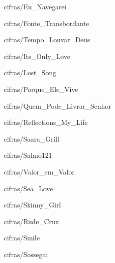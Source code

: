\documentclass{scrartcl}
\begin{document}

{cifras/Eu_Navegarei}


{cifras/Fonte_Transbordante}


{cifras/Tempo_Louvar_Deus}


{cifras/Its_Only_Love}


{cifras/Lost_Song}


{cifras/Porque_Ele_Vive}


{cifras/Quem_Pode_Livrar_Senhor}


{cifras/Reflections_My_Life}


{cifras/Saara_Grill}


{cifras/Salmo121}


{cifras/Valor_em_Valor}


{cifras/Sea_Love}


{cifras/Skinny_Girl}


{cifras/Rude_Cruz}


{cifras/Smile}


{cifras/Sossegai}
\end{document}
